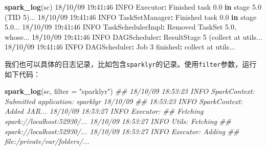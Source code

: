 \documentclass[
]{article}
\newenvironment{Shaded}{\begin{snugshade}}{\end{snugshade}}
\newcommand{\CommentTok}[1]{\textcolor[rgb]{0.56,0.35,0.01}{\textit{#1}}}
\newcommand{\ControlFlowTok}[1]{\textcolor[rgb]{0.13,0.29,0.53}{\textbf{#1}}}
\newcommand{\DataTypeTok}[1]{\textcolor[rgb]{0.13,0.29,0.53}{#1}}
\newcommand{\DecValTok}[1]{\textcolor[rgb]{0.00,0.00,0.81}{#1}}
\newcommand{\FloatTok}[1]{\textcolor[rgb]{0.00,0.00,0.81}{#1}}
\newcommand{\KeywordTok}[1]{\textcolor[rgb]{0.13,0.29,0.53}{\textbf{#1}}}
\newcommand{\NormalTok}[1]{#1}
\newcommand{\OperatorTok}[1]{\textcolor[rgb]{0.81,0.36,0.00}{\textbf{#1}}}
\newcommand{\StringTok}[1]{\textcolor[rgb]{0.31,0.60,0.02}{#1}}
\begin{document}
\begin{Shaded}
\begin{Highlighting}[]
\KeywordTok{spark_log}\NormalTok{(sc)}
\DecValTok{18}\OperatorTok{/}\DecValTok{10}\OperatorTok{/}\DecValTok{09} \DecValTok{19}\OperatorTok{:}\DecValTok{41}\OperatorTok{:}\DecValTok{46}\NormalTok{ INFO Executor}\OperatorTok{:}\StringTok{ }\NormalTok{Finished task }\FloatTok{0.0} \ControlFlowTok{in}\NormalTok{ stage }\FloatTok{5.0}\NormalTok{ (TID }\DecValTok{5}\NormalTok{)...}
\DecValTok{18}\OperatorTok{/}\DecValTok{10}\OperatorTok{/}\DecValTok{09} \DecValTok{19}\OperatorTok{:}\DecValTok{41}\OperatorTok{:}\DecValTok{46}\NormalTok{ INFO TaskSetManager}\OperatorTok{:}\StringTok{ }\NormalTok{Finished task }\FloatTok{0.0} \ControlFlowTok{in}\NormalTok{ stage }\DecValTok{5}\NormalTok{.}\DecValTok{0}\NormalTok{...}
\DecValTok{18}\OperatorTok{/}\DecValTok{10}\OperatorTok{/}\DecValTok{09} \DecValTok{19}\OperatorTok{:}\DecValTok{41}\OperatorTok{:}\DecValTok{46}\NormalTok{ INFO TaskSchedulerImpl}\OperatorTok{:}\StringTok{ }\NormalTok{Removed TaskSet }\FloatTok{5.0}\NormalTok{, whose...}
\DecValTok{18}\OperatorTok{/}\DecValTok{10}\OperatorTok{/}\DecValTok{09} \DecValTok{19}\OperatorTok{:}\DecValTok{41}\OperatorTok{:}\DecValTok{46}\NormalTok{ INFO DAGScheduler}\OperatorTok{:}\StringTok{ }\NormalTok{ResultStage }\DecValTok{5}\NormalTok{ (collect at utils...}
\DecValTok{18}\OperatorTok{/}\DecValTok{10}\OperatorTok{/}\DecValTok{09} \DecValTok{19}\OperatorTok{:}\DecValTok{41}\OperatorTok{:}\DecValTok{46}\NormalTok{ INFO DAGScheduler}\OperatorTok{:}\StringTok{ }\NormalTok{Job }\DecValTok{3}\NormalTok{ finished}\OperatorTok{:}\StringTok{ }\NormalTok{collect at utils...}
\end{Highlighting}
\end{Shaded}

我们也可以具体的日志记录，比如包含\texttt{sparklyr}的记录。使用\texttt{filter}参数，运行如下代码：

\begin{Shaded}
\begin{Highlighting}[]
\KeywordTok{spark_log}\NormalTok{(sc, }\DataTypeTok{filter =} \StringTok{"sparklyr"}\NormalTok{)}
\CommentTok{## 18/10/09 18:53:23 INFO SparkContext: Submitted application: sparklyr 18/10/09}
\CommentTok{## 18:53:23 INFO SparkContext: Added JAR...  18/10/09 18:53:27 INFO Executor:}
\CommentTok{## Fetching spark://localhost:52930/...  18/10/09 18:53:27 INFO Utils: Fetching}
\CommentTok{## spark://localhost:52930/...  18/10/09 18:53:27 INFO Executor: Adding}
\CommentTok{## file:/private/var/folders/...}
\end{Highlighting}
\end{Shaded}
\end{document}
